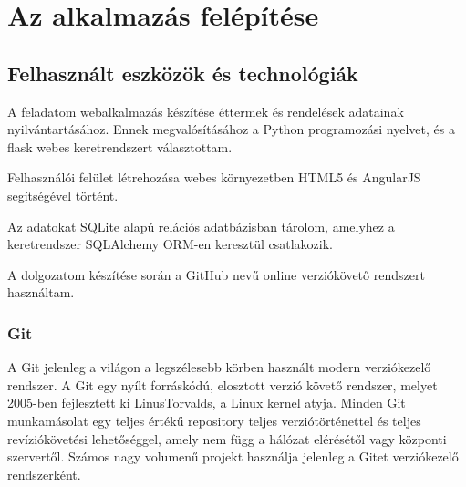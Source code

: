 \chapter{Az alkalmazás felépítése}




\section{Felhasznált eszközök és technológiák}

A feladatom webalkalmazás készítése éttermek és rendelések adatainak nyilvántartásához. Ennek megvalósításához a Python programozási nyelvet, és a flask webes keretrendszert választottam.

Felhasználói felület létrehozása webes környezetben HTML5 és AngularJS segítségével történt.

Az adatokat SQLite alapú relációs adatbázisban tárolom, amelyhez a keretrendszer SQLAlchemy ORM-en keresztül csatlakozik. 

A dolgozatom készítése során a GitHub nevű online verziókövető rendszert használtam.

\subsection{Git}

A Git jelenleg a világon a legszélesebb körben használt modern verziókezelő rendszer. A Git egy nyílt forráskódú, elosztott verzió követő rendszer, melyet 2005-ben fejlesztett ki LinusTorvalds, a Linux kernel atyja. Minden Git munkamásolat egy teljes értékű repository teljes verziótörténettel és teljes revíziókövetési lehetőséggel, amely nem függ a hálózat elérésétől vagy központi szervertől. Számos nagy volumenű projekt használja jelenleg a Gitet verziókezelő rendszerként.


